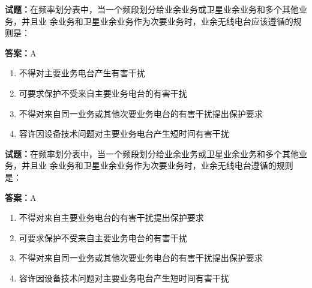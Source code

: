 \documentclass{ctexbook}
\begin{document}




\vspace{1em}

\textbf{试题：}在频率划分表中，当一个频段划分给业余业务或卫星业余业务和多个其他业务，并且业
余业务和卫星业余业务作为次要业务时，业余无线电台应该遵循的规则是： 

\textbf{答案：}A 

\begin{enumerate}[leftmargin=3em]
  \item 不得对主要业务电台产生有害干扰 

  \item 可要求保护不受来自主要业务电台的有害干扰 

  \item 不得对来自同一业务或其他次要业务电台的有害干扰提出保护要求 

  \item 容许因设备技术问题对主要业务电台产生短时间有害干扰 


\end{enumerate}





\vspace{1em}

\textbf{试题：}在频率划分表中，当一个频段划分给业余业务或卫星业余业务和多个其他业务，并且业
余业务和卫星业余业务作为次要业务时，业余无线电台遵循的规则是： 

\textbf{答案：}A 

\begin{enumerate}[leftmargin=3em]
  \item 不得对来自主要业务电台的有害干扰提出保护要求 

  \item 可要求保护不受来自主要业务电台的有害干扰 

  \item 不得对来自同一业务或其他次要业务电台的有害干扰提出保护要求 

  \item 容许因设备技术问题对主要业务电台产生短时间有害干扰 

\end{enumerate}



\end{document}
